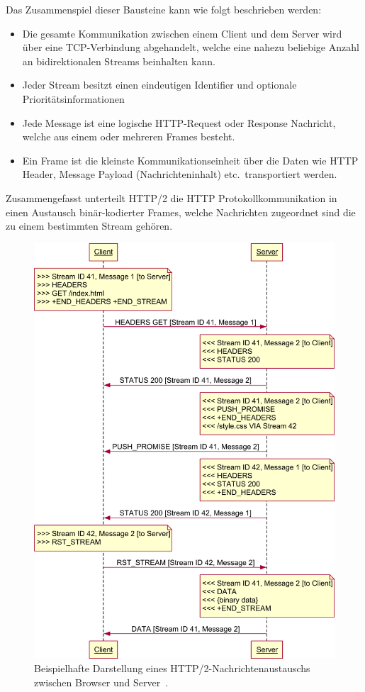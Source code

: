\documentclass[a4paper, justified, notoc]{tufte-handout} %
\begin{document}
Das Zusammenspiel dieser Bausteine kann wie folgt beschrieben werden:
\begin{itemize}
	\item Die gesamte Kommunikation zwischen einem Client und dem Server wird über eine TCP-Verbindung abgehandelt, welche eine nahezu beliebige Anzahl an bidirektionalen Streams beinhalten kann.
	\item Jeder Stream besitzt einen eindeutigen Identifier und optionale Prioritätsinformationen
	\item Jede Message ist eine logische HTTP-Request oder Response Nachricht, welche aus einem oder mehreren Frames besteht.
	\item Ein Frame ist die kleinste Kommunikationseinheit über die Daten wie HTTP Header, Message Payload (Nachrichteninhalt) etc.\ transportiert werden. 
\end{itemize}

Zusammengefasst unterteilt HTTP/2 die HTTP Protokollkommunikation in einen Austausch binär-kodierter Frames, welche Nachrichten zugeordnet sind die zu einem bestimmten Stream gehören.  

\begin{figure}%
	\centering
  \includegraphics[width=1\textwidth]{./figures/http2_streams.png}
  \caption{Beispielhafte Darstellung eines HTTP/2-Nachrichtenaustauschs zwischen Browser und Server~\citep{weinschenkler:2017}.}
  \label{fig:http2_nachrichtenaustausch}
\end{figure}
\end{document}
